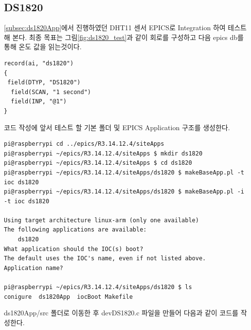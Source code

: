 \documentclass[11pt
  , a4paper
  , article
  , oneside
]{memoir}
\begin{document}
\subsection{DS1820}
\ref{subsec:ds1820App}에서 진행하였던 DHT11 센서 EPICS로 Integration 하여 테스트해 본다. 최종
목표는 그림\ref{fig:ds1820_test}과 같이 회로를 구성하고 다음 epics db를 통해 온도 값을 읽는것이다.
\begin{lstlisting}[style=termstyle]
record(ai, "ds1820")       
{
 field(DTYP, "DS1820")
  field(SCAN, "1 second")
  field(INP, "@1")
}
\end{lstlisting}
코드 작성에 앞서 테스트 할 기본 폴더 및 EPICS Application 구조를 생성한다.
\begin{lstlisting}[style=termstyle]
pi@raspberrypi cd ../epics/R3.14.12.4/siteApps
pi@raspberrypi ~/epics/R3.14.12.4/siteApps $ mkdir ds1820
pi@raspberrypi ~/epics/R3.14.12.4/siteApps $ cd ds1820
pi@raspberrypi ~/epics/R3.14.12.4/siteApps/ds1820 $ makeBaseApp.pl -t ioc ds1820
pi@raspberrypi ~/epics/R3.14.12.4/siteApps/ds1820 $ makeBaseApp.pl -i -t ioc ds1820

Using target architecture linux-arm (only one available)
The following applications are available:
    ds1820
What application should the IOC(s) boot?
The default uses the IOC's name, even if not listed above.
Application name?

pi@raspberrypi ~/epics/R3.14.12.4/siteApps/ds1820 $ ls
conigure  ds1820App  iocBoot Makefile
\end{lstlisting}
ds1820App/src 폴더로 이동한 후 devDS1820.c 파일을 만들어 다음과 같이 코드를 작성한다.
\end{document}
